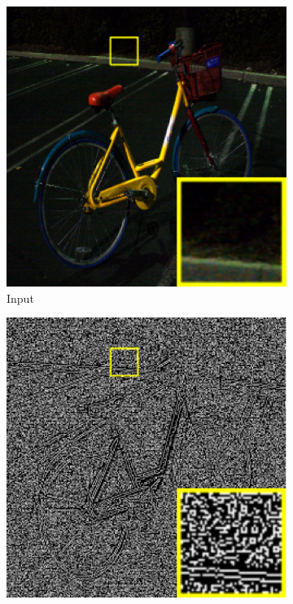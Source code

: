 \documentclass[a4paper, 10pt]{article}
\begin{document}
	\begin{figure}[htb]
		\centering
		\begin{subfigure}{0.25\columnwidth}
			\includegraphics[width=\linewidth]{picture/LLIE/Structure Modeling and Guidance/Input}
			\captionsetup{font=scriptsize}
			\caption{Input}
			\label{fig: Input}
		\end{subfigure}
		\begin{subfigure}{0.25\columnwidth}
			\includegraphics[width=\linewidth]{picture/LLIE/Structure Modeling and Guidance/Structure of (a)}

\end{subfigure}
\end{figure}
\end{document}
